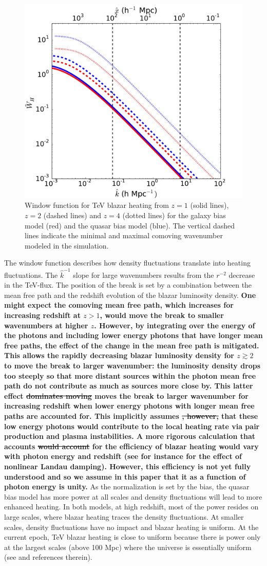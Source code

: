 \documentclass[numberedappendix]{emulateapj}
\newcommand\Pc[1]{{\color{cyan} \bf #1}} %
\newcommand\Cc[1]{{\color{blue} \bf #1}} %
\newcommand\Ec[1]{{\color{magenta} \bf #1}} %
\begin{document}
\begin{figure}[h]
\centering
 \includegraphics[width = .45\textwidth ]{window_gal_qso}

\caption{Window function for TeV blazar heating from $z=1$ (solid lines), $z=2$ (dashed lines) and $z=4$ (dotted lines) for the galaxy bias model (red) and the quasar bias model (blue).  The vertical dashed lines indicate the minimal and maximal comoving wavenumber modeled in the simulation. }
\label{fig:window}
\end{figure}
The window function describes how density fluctuations translate into heating fluctuations.  The $\hat{k}^{-1}$ slope for large wavenumbers results from the $r^{-2}$ decrease in the TeV-flux. The position of the break is set by a combination between the mean free path and the redshift evolution of the blazar luminosity density. \Pc{One might expect the comoving mean free path, which increases for increasing redshift \Cc{at $z>1$}, would move the break to smaller wavenumbers \Ec{at higher $z$}. However, by integrating over the energy of the photons and including lower energy photons that have longer mean free paths, the effect of the change in the mean free path is mitigated. This allows the rapidly decreasing blazar luminosity density for $z\gtrsim 2$ to move the break to larger wavenumber: the luminosity density drops too steeply so that more distant sources within the photon mean free path do not contribute as much as sources more close by. This latter effect \Cc{\sout{dominates moving} moves} the break to larger wavenumber for increasing redshift when lower energy photons with longer mean free paths are accounted for.  This \Cc{implicitly} assumes\Cc{\sout{, however,}} that these low energy photons would contribute to the local heating rate via pair production and plasma instabilities.  A more rigorous calculation \Cc{that accounts \sout{would account}} for the efficiency of blazar heating would vary with photon energy and redshift (see for instance \citealt{2014ApJ...797..110C} for the effect of nonlinear Landau damping). However, this efficiency is not yet fully understood and so we assume in this paper that it as a function of photon energy is unity.} As the normalization is set  by the bias, the quasar bias model has more power at all scales and density fluctuations will lead to more enhanced heating.  In  both models, at high redshift, most of the power resides on large scales, where blazar heating traces the density fluctuations. At smaller scales, density fluctuations have no impact and blazar heating is uniform. At the current epoch, TeV blazar heating is close to uniform because there is power only at the largest scales (above 100 Mpc) where the universe is essentially uniform (see \citet{2013MNRAS.429.2910C} and references therein).
\end{document}
